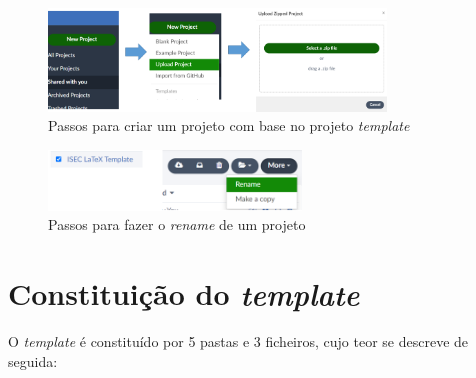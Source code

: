     \begin{figure}[htp]
    	\centering
    	\includegraphics[width=0.8\textwidth]{Figuras/UploadProject}
     \caption{\small{Passos para criar um projeto com base no projeto \textit{template}}}
    	\label{fig-upload}
    \end{figure}

     \begin{figure}[htp]
    	\centering
    	\includegraphics[width=0.6\textwidth]{Figuras/RenameProject}
     \caption{\small{Passos para fazer o \textit{rename} de um projeto}}
    	\label{fig-rename}
    \end{figure}
    
\section{Constituição do \textit{template}}
    
    O \textit{template} é constituído por 5 pastas e 3 ficheiros, cujo teor se descreve de seguida:
    
